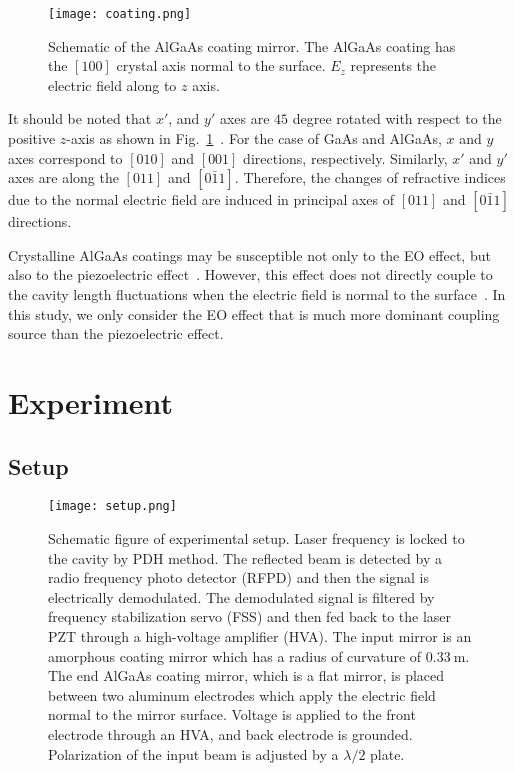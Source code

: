 \documentclass[%
 reprint,
 superscriptaddress,
 amsmath,amssymb,
 aps,
]{revtex4-2}
\newcommand{\unit}[1]{\ \mathrm{#1}}
\begin{document}
\begin{figure}[htbp]
\texttt{[image: coating.png]}
\caption{
Schematic of the AlGaAs coating mirror.
The AlGaAs coating has the $[100]$ crystal axis normal to the surface.
$E_z$ represents the electric field along to $z$ axis.
}
\label{fig.coating}
\end{figure}



It should be noted that $x'$, and $y'$ axes are $45$ degree rotated with respect to the positive $z$-axis as shown in Fig.~\ref{fig.coating}~\cite{Namba1961, yariv}.
For the case of GaAs and AlGaAs, $x$ and $y$ axes correspond to $[010]$ and $[001]$ directions, respectively.
Similarly, $x'$ and $y'$ axes are along the $[011]$ and $[0\bar{1}1]$.
Therefore, the changes of refractive indices due to the normal electric field are induced in principal axes of $[011]$ and $[0\bar{1}1]$ directions.

Crystalline AlGaAs coatings may be susceptible not only to the EO effect, but also to the piezoelectric effect~\cite{Nye1985}.
However, this effect does not directly couple to the cavity length fluctuations when the electric field is normal to the surface~\cite{Fricke1991}.
In this study, we only consider the EO effect that is much more dominant coupling source than the piezoelectric effect.


\section{Experiment}

\subsection{Setup}

\begin{figure}[htbp]
\texttt{[image: setup.png]}
\caption{
Schematic figure of experimental setup.
Laser frequency is locked to the cavity by PDH method. The reflected beam is detected by a radio frequency photo detector (RFPD) and then the signal is electrically demodulated. The demodulated signal is filtered by frequency stabilization servo (FSS) and then fed back to the laser PZT through a high-voltage amplifier (HVA).
The input mirror is an amorphous coating mirror which has a radius of curvature of $0.33\unit{m}$.
The end AlGaAs coating mirror, which is a flat mirror, is placed between two aluminum electrodes which apply the electric field normal to the mirror surface.
Voltage is applied to the front electrode through an HVA, and back electrode is grounded.
Polarization of the input beam is adjusted by a $\lambda/2$ plate.
}
\label{fig.setup}
\end{figure}
\end{document}
